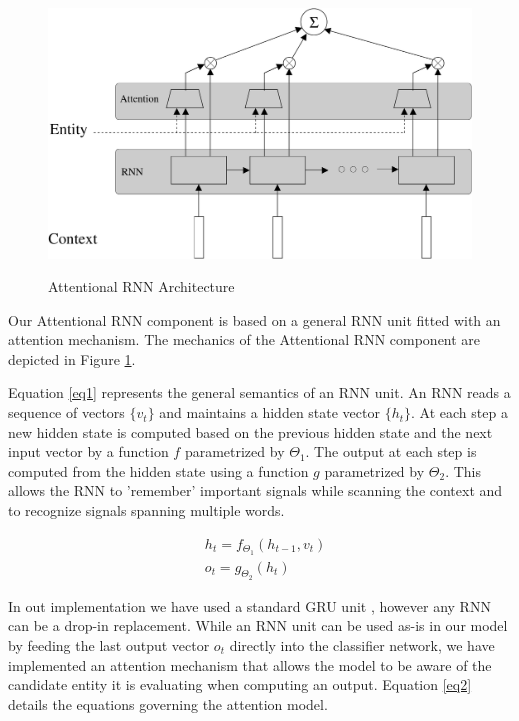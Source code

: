 \documentclass[11pt]{article}
\begin{document}
\begin{figure}
	\centering 
	\caption{Attentional RNN Architecture}
	\includegraphics[scale=0.25]{diagrams/RNN_ATTN.pdf}
	\label{fig:arnn}
\end{figure}	

Our Attentional RNN component is based on a general RNN unit fitted with an attention mechanism. The mechanics of the Attentional RNN component are depicted in Figure \ref{fig:arnn}. 
	
Equation \ref{eq1} represents the general semantics of an RNN unit. An RNN reads a sequence of vectors $\{v_t\}$ and maintains a hidden state vector $\{h_t\}$. At each step a new hidden state is computed based on the previous hidden state and the next input vector by a function $f$ parametrized by $\Theta_1$. The output at each step is computed from the hidden state using a function $g$ parametrized by $\Theta_2$. This allows the RNN to 'remember' important signals while scanning the context and to recognize signals spanning multiple words.

\begin{equation}
\label{eq1}
\begin{aligned}
& h_t=f_{\Theta_1}(h_{t-1}, v_t) \\
& o_t=g_{\Theta_2}(h_t)
\end{aligned}
\end{equation}

In out implementation we have used a standard GRU unit \cite{cho2014learning}, however any RNN can be a drop-in replacement. While an RNN unit can be used as-is in our model by feeding the last output vector $o_t$ directly into the classifier network, we have implemented an attention mechanism that allows the model to be aware of the candidate entity it is evaluating when computing an output. Equation \ref{eq2} details the equations governing the attention model.
\end{document}
